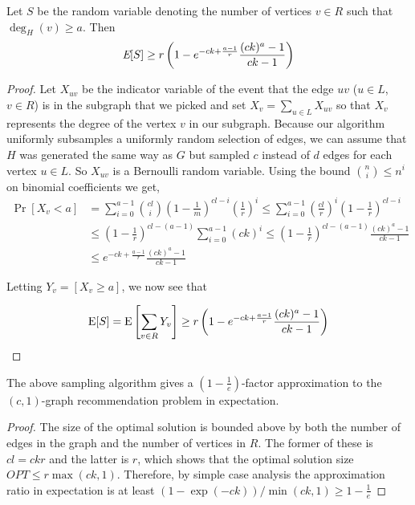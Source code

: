 \begin{thm}\label{original_result}
Let $S$ be the
random variable denoting the number of vertices $v \in R$ such that
$\deg_{H}(v)\geq a$. Then
\[ \emph{\text{E}}[S] \geq r\left(1-e^{-ck+\frac{a-1}{r}}\frac{(ck)^a-1}{ck-1}\right)  \]
\end{thm}

\begin{proof}
Let $X_{uv}$ be the indicator variable of the event that the edge $uv$
($u\in L$, $v\in R$) is in the subgraph that we picked
and set $X_{v} = \sum_{u\in L} X_{uv}$ so that $X_{v}$ represents the
degree of the vertex $v$ in our subgraph. Because our algorithm
uniformly subsamples a uniformly random selection of edges, we can
assume that $H$ was generated the same way as $G$ but sampled $c$
instead of $d$ edges for each vertex $u\in L$. So $X_{uv}$ is a
Bernoulli random variable. Using the bound $\binom{n}{i}
\leq n^i$ on binomial coefficients we get,
\begin{align*}
      \Pr[X_v < a]
&=    \sum_{i=0}^{a-1} \binom{cl}{i} \left(1-\frac{1}{m}\right)^{cl-i}\left(\frac{1}{r}\right)^i
 \leq \sum_{i=0}^{a-1} \left(\frac{cl}{r}\right)^i\left(1-\frac{1}{r}\right)^{cl-i} \\
&\leq    \left(1-\frac{1}{r}\right)^{cl-(a-1)}\sum_{i=0}^{a-1} (ck)^i
 \leq \left(1-\frac{1}{r}\right)^{cl-(a-1)}\frac{(ck)^a-1}{ck-1} \\
&\leq e^{-ck+\frac{a-1}{r}} \frac{(ck)^a-1}{ck-1}
\end{align*}


Letting $Y_v = \left[X_v \geq a\right]$, we now see that

\[ \text{E}[S] = \text{E}\left[\sum_{v\in R} Y_v\right] \geq r\left(1-e^{-ck+\frac{a-1}{r}} \frac{(ck)^a-1}{ck-1}\right) \]
\end{proof}

\begin{thm}
The above sampling algorithm gives a $\left(1-\frac1e\right)$-factor approximation to the $(c,1)$-graph recommendation problem in expectation.
\end{thm}
\begin{proof}
The size of the optimal solution is bounded above by both the number
of edges in the graph and the number of vertices in $R$. The former of
these is $cl=ckr$ and the latter is $r$, which shows that the optimal solution size
$OPT \leq
r\max(ck,1)$. Therefore, by simple case analysis the approximation ratio
in expectation is at least
$ ({1-\exp(-ck)})/\min(ck,1) \geq 1-\frac{1}{e} $ 
\end{proof}


